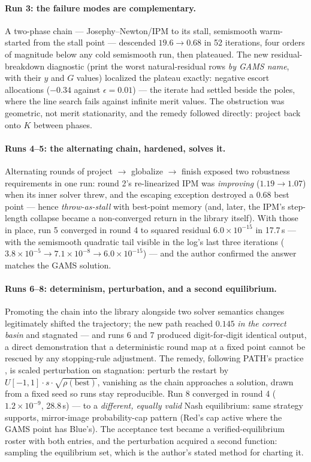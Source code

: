 \paragraph{Run 3: the failure modes are complementary.} A two-phase chain
--- Josephy--Newton/IPM to its stall, semismooth warm-started from the
stall point --- descended $19.6 \to 0.68$ in 52 iterations, four orders of
magnitude below any cold semismooth run, then plateaued. The new
residual-breakdown diagnostic (print the worst natural-residual rows
\emph{by GAMS name}, with their $y$ and $G$ values) localized the plateau
exactly: negative escort allocations ($-0.34$ against $\epsilon = 0.01$)
--- the iterate had settled beside the poles, where the line search fails
against infinite merit values. The obstruction was geometric, not merit
stationarity, and the remedy followed directly: project back onto $K$
between phases.

\paragraph{Runs 4--5: the alternating chain, hardened, solves it.}
Alternating rounds of project $\to$ globalize $\to$ finish exposed two
robustness requirements in one run: round 2's re-linearized IPM was
\emph{improving} ($1.19 \to 1.07$) when its inner solver threw, and the
escaping exception destroyed a $0.68$ best point --- hence
\emph{throw-as-stall} with best-point memory (and, later, the IPM's
step-length collapse became a non-converged return in the library
itself). With those in place, run 5 converged in round 4 to squared
residual $6.0\times 10^{-15}$ in 17.7\,s --- with the semismooth quadratic
tail visible in the log's last three iterations
($3.8\times 10^{-5} \to 7.1\times 10^{-8} \to 6.0\times 10^{-15}$) --- and
the author confirmed the answer matches the GAMS solution.

\paragraph{Runs 6--8: determinism, perturbation, and a second
equilibrium.} Promoting the chain into the library alongside two solver
semantics changes legitimately shifted the trajectory; the new path
reached $0.145$ \emph{in the correct basin} and stagnated --- and runs 6
and 7 produced digit-for-digit identical output, a direct demonstration
that a deterministic round map at a fixed point cannot be rescued by any
stopping-rule adjustment. The remedy, following PATH's practice
\cite{ferris1998}, is scaled perturbation on stagnation: perturb the
restart by $U[-1,1]\cdot s\cdot\sqrt{\rho(\mathrm{best})}$, vanishing as
the chain approaches a solution, drawn from a fixed seed so runs stay
reproducible. Run 8 converged in round 4 ($1.2\times 10^{-9}$, 28.8\,s)
--- to a \emph{different, equally valid} Nash equilibrium: same strategy
supports, mirror-image probability-cap pattern (Red's cap active where
the GAMS point has Blue's). The acceptance test became a
verified-equilibrium roster with both entries, and the perturbation
acquired a second function: sampling the equilibrium set, which is the
author's stated method for charting it.

